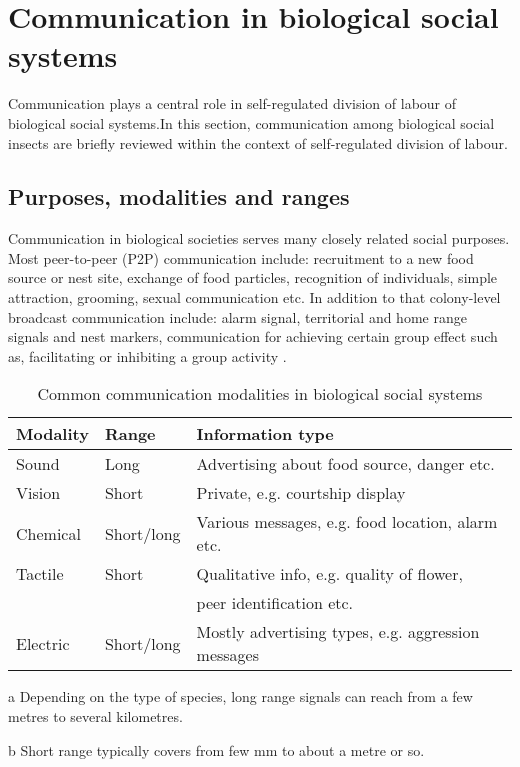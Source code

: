 \section{Communication in biological social systems}
\label{bg:bio-comm}
Communication plays a central role in self-regulated division of labour of biological social systems.In this section, communication among biological social insects are briefly reviewed within the context of self-regulated  division of labour.

\subsection{Purposes, modalities and ranges}
Communication in biological societies serves many closely related social purposes. Most peer-to-peer (P2P) communication include: recruitment to a new food source or nest site, exchange of food particles, recognition of individuals, simple attraction, grooming, sexual communication etc. In addition to that colony-level broadcast communication include: alarm signal, territorial and home range signals and nest markers, communication for achieving certain group effect such as, facilitating or inhibiting  a group activity \cite{Holldobler1990}.\\
\begin{table}
\caption{Common communication modalities in biological social systems}
\label{table:bio-comm-modalities}
\begin{center}
\begin{threeparttable}
\begin{tabular}{|l|l|l|}
\hline \textbf{Modality} & \textbf{Range} & \textbf{Information type}\\
\hline Sound & Long\tnote{a} & Advertising about food  source,  danger etc. \\                                                                                                                                               
\hline Vision & Short\tnote{b}  & Private, e.g. courtship display \\
\hline Chemical  & Short/long & Various messages, e.g. food location, alarm etc.\\
\hline Tactile & Short & Qualitative info, e.g. quality of flower,\\ & & peer identification etc.\\
\hline Electric & Short/long & Mostly advertising types, e.g. aggression messages\\
\hline
\end{tabular}
\begin{tablenotes}
\item [a]Depending on the type of species, long range signals can reach from a few metres to several kilometres.
\item [b]Short range typically covers from few mm to about a metre or so.
\end{tablenotes}
\end{threeparttable}
\end{center}
\end{table}
